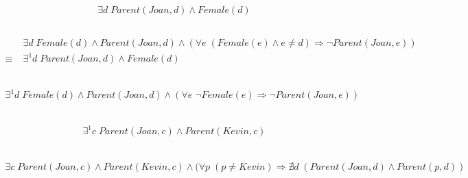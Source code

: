 \documentclass{article}
\begin{document}
    \subsection{}
    $$
        \exists d \; Parent(Joan, d) \wedge Female(d)
    $$
    \subsection{}
    \begin{align*}
        &\exists d \; Female(d) \wedge Parent(Joan, d) \wedge (\forall e \; (Female(e) \wedge e \neq d ) \Rightarrow \neg Parent(Joan, e)) \\
        \equiv \; &\exists^1 d \; Parent(Joan, d) \wedge Female(d)
    \end{align*}
    \subsection{}
    \begin{align*}
        \exists^1 d \; Female(d) \wedge Parent(Joan, d) \wedge (\forall e \; \neg Female(e) \Rightarrow \neg Parent(Joan, e))
    \end{align*}
    \subsection{}
    \begin{align*}
        \exists^1 c \; Parent(Joan, c) \wedge Parent(Kevin, c) 
    \end{align*}
    \subsection{}
    \begin{align*}
        \exists c \; Parent(Joan, c) \wedge Parent(Kevin, c) \wedge (\forall p \; (p \neq Kevin) \Rightarrow \nexists d  \; (Parent(Joan, d) \wedge Parent(p, d))
    \end{align*}
\end{document}
